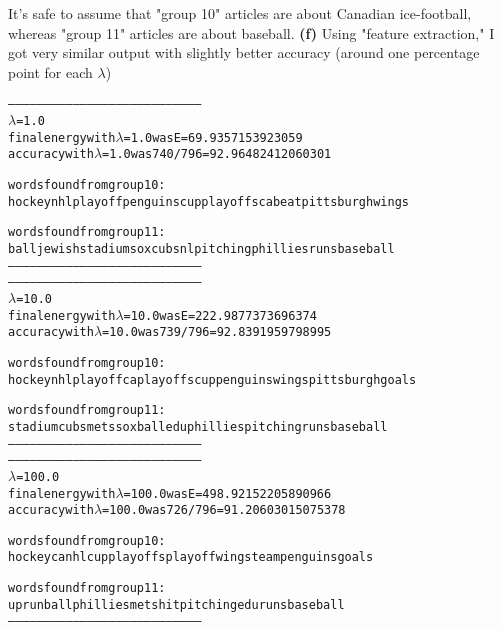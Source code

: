 \documentclass[10pt]{article}
\theoremstyle{plain}
\theoremstyle{definition}
\numberwithin{equation}{section}
\begin{document}
It's safe to assume that "group 10" articles are about Canadian ice-football, whereas "group 11" articles are about baseball.
\clearpage
\textbf{(f)} Using "feature extraction," I got very similar output with slightly better accuracy (around one percentage point for each $\lambda$)

\begin{alltt}
--------------------------------------------------------------------------------
\(\lambda\) = 1.0
final energy with \(\lambda\)=1.0 was E=69.9357153923059
accuracy with \(\lambda\)=1.0 was 740/796 = 92.96482412060301

words found from group 10:
hockey nhl playoff penguins cup playoffs ca beat pittsburgh wings

words found from group 11:
ball jewish stadium sox cubs nl pitching phillies runs baseball
--------------------------------------------------------------------------------
--------------------------------------------------------------------------------
\(\lambda\) = 10.0
final energy with \(\lambda\)=10.0 was E=222.9877373696374
accuracy with \(\lambda\)=10.0 was 739/796 = 92.8391959798995

words found from group 10:
hockey nhl playoff ca playoffs cup penguins wings pittsburgh goals

words found from group 11:
stadium cubs mets sox ball edu phillies pitching runs baseball
--------------------------------------------------------------------------------
--------------------------------------------------------------------------------
\(\lambda\) = 100.0
final energy with \(\lambda\)=100.0 was E=498.92152205890966
accuracy with \(\lambda\)=100.0 was 726/796 = 91.20603015075378

words found from group 10:
hockey ca nhl cup playoffs playoff wings team penguins goals

words found from group 11:
up run ball phillies mets hit pitching edu runs baseball
--------------------------------------------------------------------------------
\end{alltt}
\clearpage
\end{document}
